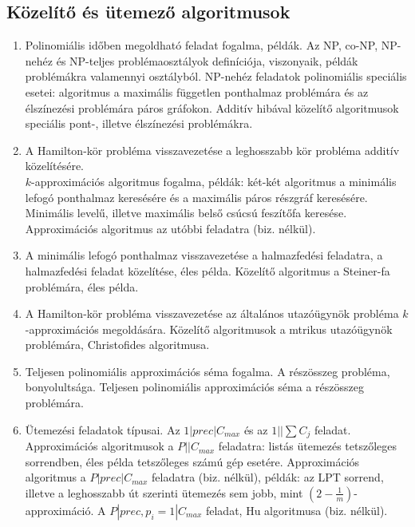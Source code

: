 \subsection*{Közelítő és ütemező algoritmusok}
\begin{enumerate}[resume]
\item	Polinomiális időben megoldható feladat fogalma, példák. Az NP, co-NP, NP-nehéz és NP-teljes problémaosztályok definíciója, viszonyaik, példák problémákra valamennyi osztályból. NP-nehéz feladatok polinomiális speciális esetei: algoritmus a maximális független ponthalmaz problémára és az élszínezési problémára páros gráfokon. Additív hibával közelítő algoritmusok speciális pont-, illetve élszínezési problémákra.
\item	A Hamilton-kör probléma visszavezetése a leghosszabb kör probléma additív közelítésére.\\ $k$-approximációs algoritmus fogalma, példák: két-két algoritmus a minimális lefogó ponthalmaz keresésére és a maximális páros részgráf keresésére. Minimális levelű, illetve maximális belső csúcsú feszítőfa keresése. Approximációs algoritmus az utóbbi feladatra (biz. nélkül).
\item	A minimális lefogó ponthalmaz visszavezetése  a halmazfedési feladatra, a halmazfedési feladat közelítése, éles példa. Közelítő algoritmus a Steiner-fa problémára, éles példa.
\item	A Hamilton-kör probléma visszavezetése az általános utazóügynök probléma $k$-approximációs megoldására. Közelítő algoritmusok a mtrikus utazóügynök problémára, Christofides algoritmusa.
\item	Teljesen polinomiális approximációs séma fogalma. A részösszeg probléma, bonyolultsága. Teljesen polinomiális approximációs séma a részösszeg problémára.
\item	Ütemezési feladatok típusai. Az $1|prec|C_{max}$ és az $1||\sum C_{j}$ feladat. Approximációs algoritmusok a $P||C_{max}$ feladatra: listás ütemezés tetszőleges sorrendben, éles példa tetszőleges számú gép esetére. Approximációs algoritmus a $P|prec|C_{max}$ feladatra (biz. nélkül), példák: az LPT sorrend, illetve a leghosszabb út szerinti ütemezés sem jobb, mint $(2-\frac {1} {m})$-approximáció. A $P|prec,p_{i}=1|C_{max}$ feladat, Hu algoritmusa (biz. nélkül).
\end{enumerate}

\vspace{3mm}
